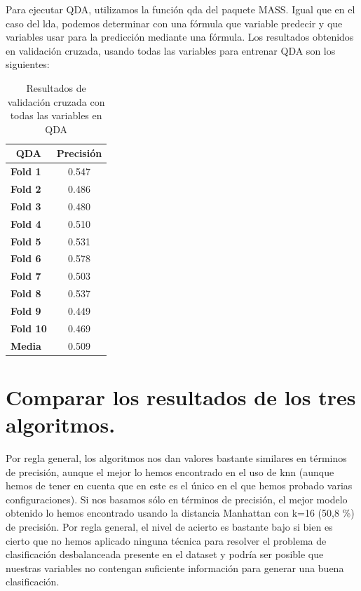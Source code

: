 \documentclass[a4paper,12pt, oneside]{book}
\begin{document}
Para ejecutar QDA, utilizamos la función qda del paquete MASS. Igual que en el caso del lda, podemos determinar con una fórmula que variable predecir y que variables usar para la predicción mediante una fórmula. Los resultados obtenidos en validación cruzada, usando todas las variables para entrenar QDA son los siguientes:
\begin{table}[H]
\centering
\begin{tabular}{@{}lc@{}}
\toprule
\multicolumn{1}{c}{\textbf{QDA}} & \textbf{Precisión} \\ \midrule
\textbf{Fold 1} & 0.547 \\
\textbf{Fold 2} & 0.486 \\
\textbf{Fold 3} & 0.480 \\
\textbf{Fold 4} & 0.510 \\
\textbf{Fold 5} & 0.531 \\
\textbf{Fold 6} & 0.578 \\
\textbf{Fold 7} & 0.503 \\
\textbf{Fold 8} & 0.537 \\
\textbf{Fold 9} & 0.449 \\
\textbf{Fold 10} & 0.469 \\
\textbf{Media} & 0.509 \\ \bottomrule
\end{tabular}
\caption{Resultados de validación cruzada con todas las variables en QDA}
\label{tab:qda}
\end{table}
\section[Comparación de algoritmos.]{Comparar los resultados de los tres algoritmos.}

Por regla general, los algoritmos nos dan valores bastante similares en términos de precisión, aunque el mejor lo hemos encontrado en el uso de knn (aunque hemos de tener en cuenta que en este es el único en el que hemos probado varias configuraciones). Si nos basamos sólo en términos de precisión, el mejor modelo obtenido lo hemos encontrado usando la distancia Manhattan con k=16 (50,8 \%) de precisión. Por regla general, el nivel de acierto es bastante bajo si bien es cierto que no hemos aplicado ninguna técnica para resolver el problema de clasificación desbalanceada presente en el dataset y podría ser posible que nuestras variables no contengan suficiente información para generar una buena clasificación.\\
\end{document}
